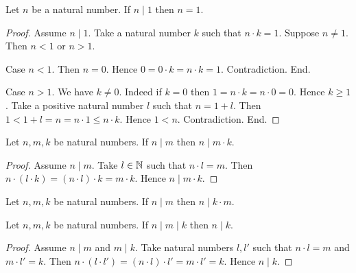 \documentclass[10pt]{article}
\begin{document}
  \begin{forthel}
    \begin{proposition}
      Let $n$ be a natural number.
      If $n \mid 1$ then $n = 1$.
    \end{proposition}
    \begin{proof}
      Assume $n \mid 1$.
      Take a natural number $k$ such that $n \cdot k = 1$.
      Suppose $n \neq 1$.
      Then $n < 1$ or $n > 1$.

      Case $n < 1$.
        Then $n = 0$.
        Hence $0
          = 0 \cdot k
          = n \cdot k
          = 1$.
        Contradiction.
      End.

      Case $n > 1$.
        We have $k \neq 0$.
        Indeed if $k = 0$ then
        $1
          = n \cdot k
          = n \cdot 0
          = 0$.
        Hence $k \geq 1$.
        Take a positive natural number $l$ such that $n = 1 + l$.
        Then $1
          < 1 + l
          = n
          = n \cdot 1
          \leq n \cdot k$.
        Hence $1 < n$.
        Contradiction.
      End.
    \end{proof}
  \end{forthel}

  \begin{forthel}
    \begin{proposition}
      Let $n, m, k$ be natural numbers.
      If $n \mid m$ then $n \mid m \cdot k$.
    \end{proposition}
    \begin{proof}
      Assume $n \mid m$.
      Take $l \in \mathbb{N}$ such that $n \cdot l = m$.
      Then $n \cdot (l \cdot k)
        = (n \cdot l) \cdot k
        = m \cdot k$.
      Hence $n \mid m \cdot k$.
    \end{proof}
  \end{forthel}

  \begin{forthel}
    \begin{corollary}
      Let $n, m, k$ be natural numbers.
      If $n \mid m$ then $n \mid k \cdot m$.
    \end{corollary}
  \end{forthel}

  \begin{forthel}
    \begin{proposition}
      Let $n, m, k$ be natural numbers.
      If $n \mid m \mid k$ then $n \mid k$.
    \end{proposition}
    \begin{proof}
      Assume $n \mid m$ and $m \mid k$.
      Take natural numbers $l,l'$ such that $n \cdot l = m$ and $m \cdot l' = k$.
      Then $n \cdot (l \cdot l')
        = (n \cdot l) \cdot l'
        = m \cdot l'
        = k$.
      Hence $n \mid k$.
    \end{proof}
  \end{forthel}
\end{document}
